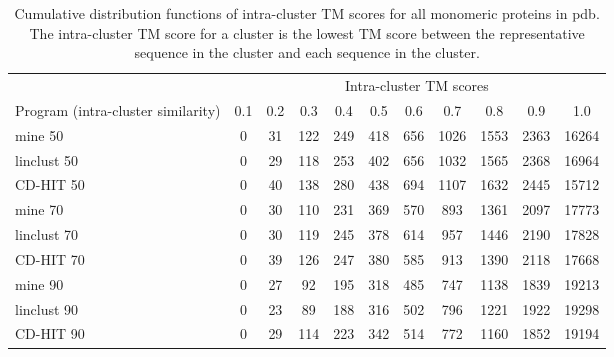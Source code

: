 \documentclass[]{article}
\begin{document}
\begin{table}%
\centering
\caption{Cumulative distribution functions of intra-cluster TM scores for all monomeric proteins in pdb. The intra-cluster TM score for a cluster is the lowest TM score between the representative sequence in the cluster and each sequence in the cluster.}

\begin{tabular}{l c c c c c c c c c c}
\toprule
 & \multicolumn{10}{c}{Intra-cluster TM scores} \\
Program (intra-cluster similarity) & 0.1 & 0.2 & 0.3 & 0.4 & 0.5 & 0.6 & 0.7 & 0.8 & 0.9 & 1.0 \\
\midrule
mine 50 & 0 & 31 & 122 & 249 & 418 & 656 & 1026 & 1553 & 2363 & 16264 \\
linclust 50 & 0 & 29 & 118 & 253 & 402 & 656 & 1032 & 1565 & 2368 & 16964 \\
CD-HIT 50 & 0 & 40 & 138 & 280 & 438 & 694 & 1107 & 1632 & 2445 & 15712 \\

mine 70 & 0 & 30 & 110 & 231 & 369 & 570 & 893 & 1361 & 2097 & 17773 \\
linclust 70 & 0 & 30 & 119 & 245 & 378 & 614 & 957 & 1446 & 2190 & 17828 \\
CD-HIT 70 & 0 & 39 & 126 & 247 & 380 & 585 & 913 & 1390 & 2118 & 17668 \\

mine 90 & 0 & 27 & 92 & 195 & 318 & 485 & 747 & 1138 & 1839 & 19213 \\
linclust 90 & 0 & 23 & 89 & 188 & 316 & 502 & 796 & 1221 & 1922 & 19298 \\
CD-HIT 90 & 0 & 29 & 114 & 223 & 342 & 514 & 772 & 1160 & 1852 & 19194 \\

\bottomrule
\end{tabular}
\end{table}
\end{document}

